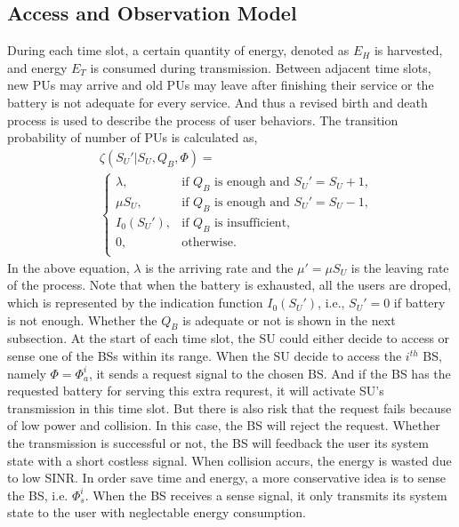 \documentclass[conference]{IEEEtran}
\begin{document}
\subsection{Access and Observation Model}
During each time slot, a certain quantity of energy, denoted as \(E_H\) is harvested,
and energy \(E_T\) is consumed during transmission.
Between adjacent time slots, new PUs may arrive and
old PUs may leave after finishing their service or the battery is not adequate for every service.
And thus a revised birth and death process is used to describe the process of user behaviors.
The transition probability of number of PUs is calculated as,
\begin{align}\label{formula1}
&\zeta\left(S_U'| S_U, Q_B, \Phi\right) = \nonumber\\
&\begin{cases}
	\lambda, &\mbox{if $Q_B$ is enough and $S_U' = S_U + 1$,}\\
	\mu S_U, &\mbox{if $Q_B$ is enough and $S_U' = S_U - 1$,}\\
	I_0\left(S_U'\right), &\mbox{if $Q_B$ is insufficient,}\\
	0, &\mbox{otherwise.}\\
\end{cases}
\end{align}
In the above equation, \(\lambda\) is the arriving rate and the \(\mu' = \mu S_U\) is the leaving rate of the process.
Note that when the battery is exhausted, all the users are droped,
which is represented by the indication function \(I_0\left(S_U'\right)\),
i.e., \(S_U' =0\) if battery is not enough.
Whether the \(Q_B\) is adequate or not is shown in the next subsection.
At the start of each time slot,
the SU could either decide to access or sense one of the BSs within its range.
When the SU decide to access the \(i^{th}\) BS, namely \(\Phi = \Phi_{a}^i\),
it sends a request signal to the chosen BS.
And if the BS has the requested battery for serving this extra requrest, 
it will activate SU's transmission in this time slot.
But there is also risk that the request fails because of low power and collision.
In this case, the BS will reject the request.
Whether the transmission is successful or not, the BS will feedback the user its system state with a short costless signal.
When collision accurs, the energy is wasted due to low SINR.
In order save time and energy, a more conservative idea is to sense the BS, i.e. \(\Phi_{s}^i\).
When the BS receives a sense signal,
it only transmits its system state to the user with neglectable energy consumption.
\end{document}
